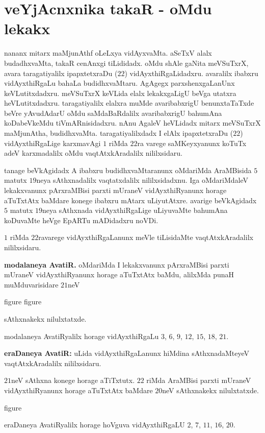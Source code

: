 \chapter{veYjAcnxnika takaR - oMdu lekakx}

nananx mitarx maMjunAthf oLeLxya vidAyxvaMta. aSeTxV alalx budadhxvaMta, takaR cenAnxgi tiLididadx. oMdu shAle gaNita meVSuTxrX, avara taragatiyalilx ipapxtetxraDu ($22$) vidAyxthiRgaLidadxru. avaralilx ibabxru vidAyxthiRgaLu bahaLa budidhxvaMtaru. AgAgegx parxshenxgaLanUnx keVLutitxdadxru. meVSuTxrX keVLida elalx lekakxgaLigU beVga utatxra heVLutitxdadxru. taragatiyalilx elalxra muMde avaribabxrigU benunxtaTaTxde beVre yAvudAdarU oMdu saMdaBaRdalilx avaribabxrigU bahumAna koDabeVkeMdu tiVmARnisidadxru. nAnu AgaleV heVLidadx mitarx meVSuTxrX maMjunAtha, budidhxvaMta. taragatiyalilxdadx I elAlx ipapxtetxraDu ($22$) vidAyxthiRgaLige karxmavAgi $1$ riMda $22$ra varege saMKeyxyanunx koTuTx adeV karxmadalilx oMdu vaqtAtxkAradalilx nililxsidaru.

tanage beVkAgidadx A ibabxru budidhxvaMtaranunx oMdariMda AraMBisida $5$ matutx $19$neya sAthxnadalilx vaqtatxdalilx nililxsidadxnu. Iga oMdariMdaleV lekakxvanunx pArxraMBisi parxti mUraneV vidAyxthiRyanunx horage aTuTxtAtx baMdare konege ibabxru mAtarx uLiyutAtxre. avarige beVkAgidadx $5$ matutx $19$neya sAthxnada vidAyxthiRgaLige uLiyuvaMte bahumAna koDuvaMte heVge EpARTu mADidadxru noVDi.

$1$ riMda $22$ravarege vidAyxthiRgaLanunx meVle tiLisidaMte vaqtAtxkAradalilx nililxsidaru.

{\bf modalaneya AvatiR.} oMdariMda I lekakxvanunx pArxraMBisi parxti mUraneV vidAyxthiRyanunx horage aTuTxtAtx baMdu, alilxMda punaH muMduvarisidare $21$neV
\begin{center}
{\rm figure}
{\rm figure}
\end{center}
 sAthxnakekx nilulxtatxde.

modalaneya AvatiRyalilx horage vidAyxthiRgaLu $3$, $6$, $9$, $12$, $15$, $18$, $21$.

{\bf eraDaneya AvatiR:} uLida vidAyxthiRgaLanunx hiMdina sAthxnadaMteyeV vaqtAtxkAradalilx nililxsidaru.

$21$neV sAthxna konege horage aTiTxtutx. $22$ riMda AraMBisi parxti mUraneV vidAyxthiRyanunx horage aTuTxtAtx baMdare $20$neV sAthxnakekx nilulxtatxde. 
\begin{center}
{\rm figure}
\end{center}

eraDaneya AvatiRyalilx horage hoVguva vidAyxthiRgaLU $2$, $7$, $11$, $16$, $20$.


